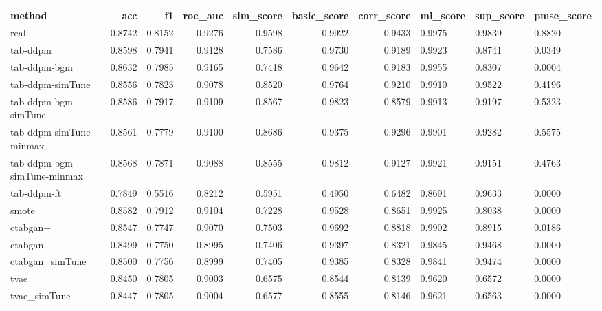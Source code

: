 \begin{tabular}{lrrrrrr}
	\toprule
	method                      & acc    & f1     & roc_auc & sim_score & basic_score & corr_score & ml_score & sup_score & pmse_score \\
	\midrule
	real                        & 0.8742 & 0.8152 & 0.9276  & 0.9598    & 0.9922      & 0.9433     & 0.9975   & 0.9839    & 0.8820     \\
	tab-ddpm                    & 0.8598 & 0.7941 & 0.9128  & 0.7586    & 0.9730      & 0.9189     & 0.9923   & 0.8741    & 0.0349     \\
	tab-ddpm-bgm                & 0.8632 & 0.7985 & 0.9165  & 0.7418    & 0.9642      & 0.9183     & 0.9955   & 0.8307    & 0.0004     \\
	tab-ddpm-simTune            & 0.8556 & 0.7823 & 0.9078  & 0.8520    & 0.9764      & 0.9210     & 0.9910   & 0.9522    & 0.4196     \\
	tab-ddpm-bgm-simTune        & 0.8586 & 0.7917 & 0.9109  & 0.8567    & 0.9823      & 0.8579     & 0.9913   & 0.9197    & 0.5323     \\
	tab-ddpm-simTune-minmax     & 0.8561 & 0.7779 & 0.9100  & 0.8686    & 0.9375      & 0.9296     & 0.9901   & 0.9282    & 0.5575     \\
	tab-ddpm-bgm-simTune-minmax & 0.8568 & 0.7871 & 0.9088  & 0.8555    & 0.9812      & 0.9127     & 0.9921   & 0.9151    & 0.4763     \\
	tab-ddpm-ft                 & 0.7849 & 0.5516 & 0.8212  & 0.5951    & 0.4950      & 0.6482     & 0.8691   & 0.9633    & 0.0000     \\
	smote                       & 0.8582 & 0.7912 & 0.9104  & 0.7228    & 0.9528      & 0.8651     & 0.9925   & 0.8038    & 0.0000     \\
	ctabgan+                    & 0.8547 & 0.7747 & 0.9070  & 0.7503    & 0.9692      & 0.8818     & 0.9902   & 0.8915    & 0.0186     \\
	ctabgan                     & 0.8499 & 0.7750 & 0.8995  & 0.7406    & 0.9397      & 0.8321     & 0.9845   & 0.9468    & 0.0000     \\
	ctabgan_simTune             & 0.8500 & 0.7756 & 0.8999  & 0.7405    & 0.9385      & 0.8328     & 0.9841   & 0.9474    & 0.0000     \\
	tvae                        & 0.8450 & 0.7805 & 0.9003  & 0.6575    & 0.8544      & 0.8139     & 0.9620   & 0.6572    & 0.0000     \\
	tvae_simTune                & 0.8447 & 0.7805 & 0.9004  & 0.6577    & 0.8555      & 0.8146     & 0.9621   & 0.6563    & 0.0000     \\
	\bottomrule
\end{tabular}






